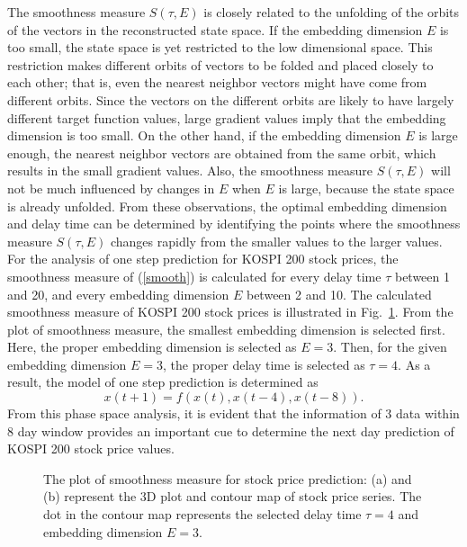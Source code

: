 \documentclass[runningheads,a4paper]{llncs}
\begin{document}
The smoothness measure $S(\tau,E)$ is closely related to the unfolding
        of the orbits of the vectors in the reconstructed state space. If
        the embedding dimension $E$ is too small, the state space is
        yet restricted to the low dimensional space. This
        restriction makes different orbits of vectors to be folded
        and placed closely to each other; that is, even the nearest neighbor
        vectors might have come from different orbits. Since the vectors
        on the different orbits are likely to have largely
        different target function values, large
        gradient values imply that the embedding dimension is too
        small. On the other hand, if the embedding dimension $E$ is
        large enough, the nearest neighbor vectors are obtained from
        the same orbit, which results in the small gradient values.
        Also, the smoothness measure $S(\tau,E)$ will not be much influenced by
        changes in $E$ when $E$ is large, because the state space is already
        unfolded.
From these observations, the optimal embedding dimension and delay
time can be determined by identifying the points where the smoothness measure
$S(\tau,E)$ changes rapidly from the smaller values to the larger values.
For the analysis of one step prediction for KOSPI 200 stock prices, the smoothness measure of (\ref{smooth}) is calculated
for every delay time $\tau$ between 1 and 20, and every embedding dimension $E$ between 2 and 10.
The calculated smoothness measure of KOSPI 200 stock prices is illustrated in Fig.~\ref{fig1}.
From the plot of smoothness measure, the smallest embedding dimension is selected first. Here, the proper
embedding dimension is selected as $E=3$. Then, for the given embedding dimension $E=3$, the proper delay time is
selected as $\tau=4$. As a result, the model of one step prediction is determined as
\begin{equation}
x(t+1) = f(x(t), x(t-4), x(t-8)).
\label{pr_model}
\end{equation}
From this phase space analysis, it is evident that the information of
3 data within 8 day window provides an important cue to determine the next day prediction
of KOSPI 200 stock price values.
\begin{figure}[t]
\centering \setcounter{subfigure}{0} \vspace{-1em}
\caption{The plot of smoothness measure for stock price prediction: (a) and (b) represent the 3D plot and contour map of stock price series. The dot in the contour map represents the selected delay time $\tau=4$ and embedding dimension $E=3$.}
\label{fig1}
\end{figure}
\end{document}
